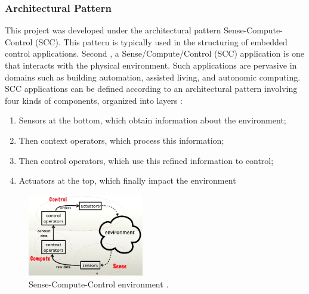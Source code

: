 \documentclass{acm_proc_article-sp}
\begin{document}
\subsubsection{Architectural Pattern}
This project was developed under the architectural pattern Sense-Compute-Control (SCC). This pattern is typically used in the structuring of embedded control applications. Second \cite{taylor2009software}, a Sense/Compute/Control (SCC) application is one that interacts with the physical environment. Such applications are pervasive in domains such as building automation, assisted living, and autonomic computing. SCC applications can be defined according to an architectural pattern involving four kinds of components, organized into layers \cite{edwards2009architecture}: 
\begin{enumerate}
\item Sensors at the bottom, which obtain information about the environment; 
\item Then context operators, which process this information; 
\item Then control operators, which use this refined information to control;
\item Actuators at the top, which finally impact the environment
\end{enumerate}

\begin{figure}[h]
\centering
    \includegraphics[width=0.45\textwidth,natwidth=610,natheight=642]{pictures/senseComputeControl2.png}
    \caption{Sense-Compute-Control environment \protect\cite{DamienCassou}.}
    \label{fig:scc}
\end{figure}
\end{document}
